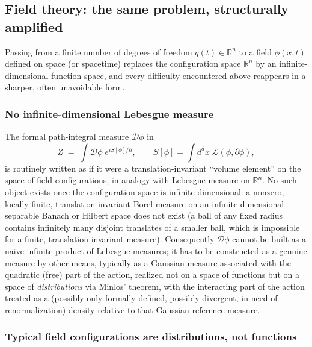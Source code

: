\label{submultiplicity-recall}

\subsection{Field theory: the same problem, structurally amplified}
\label{field}

Passing from a finite number of degrees of freedom $q(t)\in\mathbb{R}^n$ to a
field $\phi(x,t)$ defined on space (or spacetime) replaces the configuration
space $\mathbb{R}^n$ by an infinite-dimensional function space, and every
difficulty encountered above reappears in a sharper, often unavoidable form.

\subsubsection{No infinite-dimensional Lebesgue measure}

The formal path-integral measure $\mathcal{D}\phi$ in
\[
Z \;=\; \int \mathcal{D}\phi\; e^{iS[\phi]/\hbar}, 
\qquad S[\phi]=\int d^dx\; \mathcal L(\phi,\partial\phi),
\]
is routinely written as if it were a translation-invariant ``volume element''
on the space of field configurations, in analogy with Lebesgue measure on
$\mathbb{R}^n$. No such object exists once the configuration space is
infinite-dimensional: a nonzero, locally finite, translation-invariant Borel
measure on an infinite-dimensional separable Banach or Hilbert space does not
exist (a ball of any fixed radius contains infinitely many disjoint translates
of a smaller ball, which is impossible for a finite, translation-invariant
measure). Consequently $\mathcal{D}\phi$ cannot be built as a naive infinite
product of Lebesgue measures; it has to be constructed as a genuine measure by
other means, typically as a Gaussian measure associated with the quadratic
(free) part of the action, realized not on a space of functions but on a space
of \emph{distributions} via Minlos' theorem, with the interacting part of the
action treated as a (possibly only formally defined, possibly divergent, in
need of renormalization) density relative to that Gaussian reference measure.

\subsubsection{Typical field configurations are distributions, not functions}

